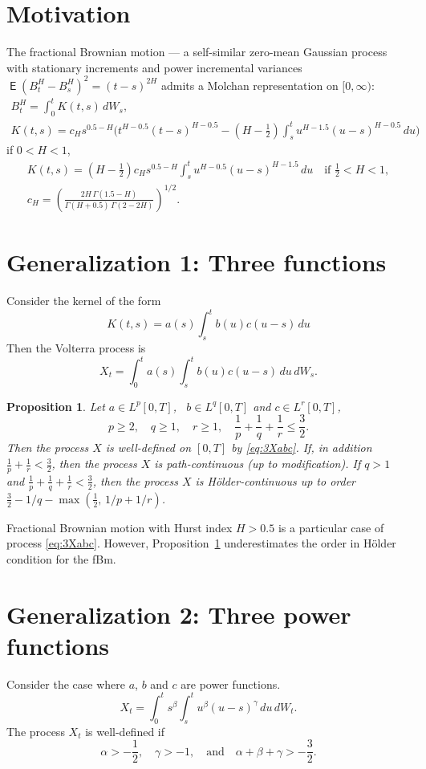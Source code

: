 \documentclass{article}
\DeclareMathOperator{\ME}{\mathsf{E}}
\theoremstyle{plain}
\newtheorem{proposition}{Proposition}
\theoremstyle{definition}
\begin{document}
\section{Motivation}
The fractional Brownian motion ---
a self-similar zero-mean Gaussian process with stationary increments
and power incremental variances $\ME (B^H_t - B^H_s)^2 = (t-s)^{2H}$
admits a Molchan representation on $[0,\infty)$:
\begin{gather*}
B^H_t = \int_0^t K(t,s) \, dW_s, \\
K(t,s) = c_H s^{0.5-H} \biggl( t^{H-0.5} (t{-}s)^{H-0.5} -
\left(H{-}{\textstyle\frac12}\right) \int_s^t u^{H-1.5} (u{-}s)^{H-0.5}\, du
\biggr)
\end{gather*}
if $0<H<1$,
\begin{gather*}
K(t,s) = 
\left(H{-}{\textstyle\frac12}\right) c_H
s^{0.5-H} \int_s^t u^{H-0.5} (u-s)^{H-1.5} \, du \quad
\mbox{if $\frac12{<}H{<}1$},
\\
c_H = \left( \frac
{2 H \, \Gamma(1.5-H)}
{\Gamma(H+0.5)\, \Gamma(2-2H)}
\right)^{1/2} .
\end{gather*}

\section{Generalization 1: Three functions}
Consider the kernel of the form
\[
K(t,s) = a(s) \int_s^t b(u) c(u-s) \, du
\]
Then the Volterra process is
\begin{equation}\label{eq:3Xabc}
X_t = \int_0^t a(s) \int_s^t b(u) c(u-s)\, du \, dW_s .
\end{equation}
\begin{proposition}\label{prop:1}
Let $a\in L^p[0,T]$, \, $b\in L^q[0,T]$
and $c\in L^r[0,T]$,
\[
p\ge 2,\quad
q\ge 1,\quad
r\ge 1,\quad
\frac{1}{p}+\frac{1}{q}+\frac{1}{r}\le \frac32.
\]
Then the process $X$ is well-defined on $[0,T]$ by \eqref{eq:3Xabc}.
If, in addition  $\frac{1}{p}+\frac{1}{r} < \frac32$,
then the process $X$ is  path-continuous (up to modification).
If $q>1$ and $\frac{1}{p}+\frac{1}{q}+\frac{1}{r} < \frac32$,
then the process $X$ is H\"older-continuous up
to order $\frac32 - 1/q - \max(\frac12, \, 1/p+1/r)$.
\end{proposition}
Fractional Brownian motion with Hurst index $H>0.5$
is a particular case of process \eqref{eq:3Xabc}.
However, Proposition~\ref{prop:1}
underestimates the order in H\"older condition for the fBm.

\section{Generalization 2: Three power functions}
Consider the case where $a$, $b$ and $c$ are power functions.
\[
X_t = \int_0^t s^\beta \int_s^t u^\beta (u-s)^\gamma \,  du \, dW_t.
\]
The process $X_t$ is well-defined if
\[
\alpha>-\frac12, \quad \gamma>-1, \quad
\mbox{and} \quad
\alpha+\beta+\gamma>-\frac32.
\]
\end{document}
